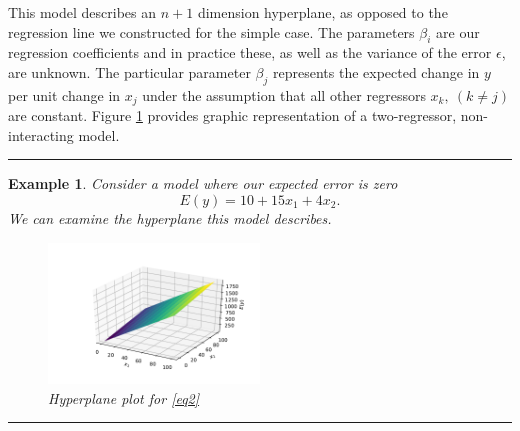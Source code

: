 \documentclass[10pt,a4paper, onecolumn, conference]{IEEEtran}
\theoremstyle{own}
\newtheorem{example}{Example}
\theoremstyle{definition}
\theoremstyle{plain}
\begin{document}
This model describes an $n + 1$ dimension hyperplane, as opposed to the regression line we constructed for the simple case. The parameters $\beta_i$ are our regression coefficients and in practice these, as well as the variance of the error $\epsilon$, are unknown. The particular parameter $\beta_j$ represents the expected change in $y$ per unit change in $x_j$ under the assumption that all other regressors $x_k,~( k \neq j )$ are constant. Figure \ref{fig1} provides graphic representation of a two-regressor, non-interacting model.
\vspace{2mm}
\hrule
\begin{example}
Consider a model where our expected error is zero
\begin{equation} \label{eq2}
E(y) = 10 + 15x_1 + 4x_2.
\end{equation}
We can examine the hyperplane this model describes.
\begin{figure}[H]
\centering
\includegraphics[width = 0.5\textwidth]{f4}
\caption{Hyperplane plot for \cref{eq2}}
\label{fig1}
\end{figure}
\end{example}
\hrule
\vspace{2mm}
\end{document}

